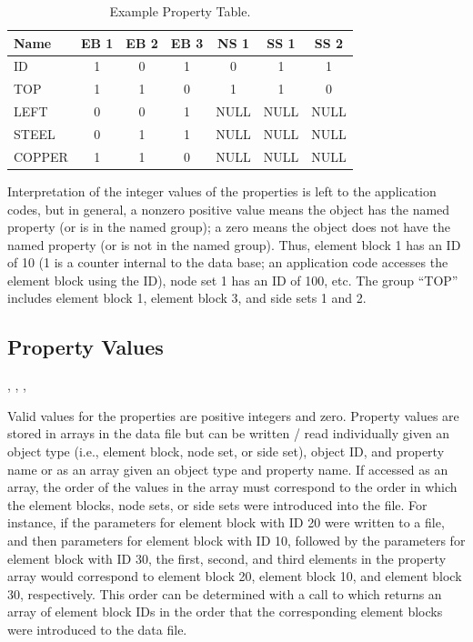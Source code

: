 \begin{table}
\begin{center}
\begin{tabular}{l|cccccc} \hline
Name   & EB 1 & EB 2 & EB 3 & NS 1 & SS 1 & SS 2 \\ \hline
ID     & 1   & 0   & 1   & 0  & 1  & 1 \\
TOP    & 1   & 1   & 0   & 1  & 1  & 0 \\
LEFT   & 0   & 0   & 1   & NULL  & NULL  & NULL \\
STEEL  & 0   & 1   & 1   & NULL  & NULL  & NULL \\
COPPER & 1   & 1   & 0   & NULL  & NULL  & NULL \\
\end{tabular}
\caption{Example Property Table.}\label{t:property}
\end{center}
\end{table}


{Interpretation of the integer values of the properties is left to the
application codes, but in general, a nonzero positive value means the
object has the named property (or is in the named group); a zero means
the object does not have the named property (or is not in the named
group). Thus, element block 1 has an ID of 10 (1 is a counter internal
to the data base; an application code accesses the element block using
the ID), node set 1 has an ID of 100, etc. The group ``TOP'' includes
element block 1, element block 3, and side sets 1 and 2.}



\subsection{Property Values}



\begin{spacing}{1.5}
\api {}, , , 
\end{spacing}

Valid values for the properties are positive integers and
zero. Property values are stored in arrays in the data file but can be
written / read individually given an object type (i.e., element block,
node set, or side set), object ID, and property name or as an array
given an object type and property name. If accessed as an array, the
order of the values in the array must correspond to the order in which
the element blocks, node sets, or side sets were introduced into the
file. For instance, if the parameters for element block with ID 20
were written to a file, and then parameters for element block with ID
10, followed by the parameters for element block with ID 30, the
first, second, and third elements in the property array would
correspond to element block 20, element block 10, and element block
30, respectively. This order can be determined with a call to
 which returns an array of element
block IDs in the order that the corresponding element blocks were
introduced to the data file.

